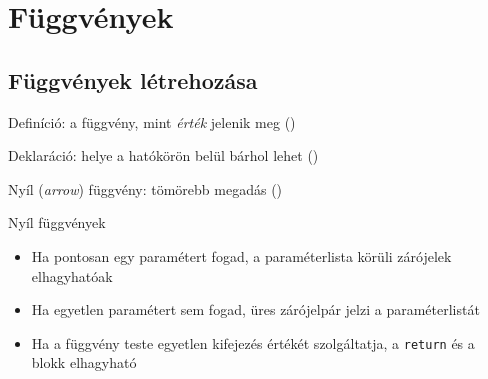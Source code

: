 \section{Függvények}

\subsection{Függvények létrehozása}

\begin{frame}
    \begin{exampleblock}{Definíció: a függvény, mint \emph{érték} jelenik meg ()}
        \small
        
    \end{exampleblock}
\end{frame}

\begin{frame}
    \begin{exampleblock}{Deklaráció: helye a hatókörön belül bárhol lehet ()}
        \small
        
    \end{exampleblock}
\end{frame}

\begin{frame}
    \begin{exampleblock}{Nyíl (\emph{arrow}) függvény: tömörebb megadás ()}
        \small
        
    \end{exampleblock}
\end{frame}

\begin{frame}
    Nyíl függvények
    \begin{itemize}
        \item Ha pontosan egy paramétert fogad, a paraméterlista körüli zárójelek elhagyhatóak
        \item Ha egyetlen paramétert sem fogad, üres zárójelpár jelzi a paraméterlistát
        \item Ha a függvény teste egyetlen kifejezés értékét szolgáltatja, a \texttt{return} és a blokk elhagyható
    \end{itemize}
    \begin{exampleblock}{}
        \small
        
    \end{exampleblock}
\end{frame}

